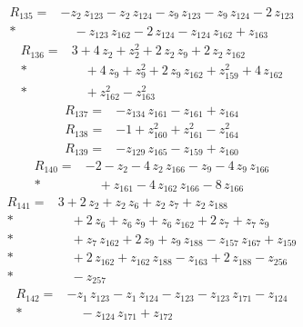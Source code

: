 \documentclass[10pt]{article}
\begin{document}
\begin{align*}
R_{135}={}& - z_{2}\,z_{123} - z_{2}\,z_{124} - z_{9}\,z_{123} - z_{9}\,z_{124} - 2\,z_{123} \\*
&\quad - z_{123}\,z_{162} - 2\,z_{124} - z_{124}\,z_{162} + z_{163}
\end{align*}
\begin{align*}
R_{136}={}& 3 + 4\,z_{2} + z_{2}^{2} + 2\,z_{2}\,z_{9} + 2\,z_{2}\,z_{162} \\*
&\quad + 4\,z_{9} + z_{9}^{2} + 2\,z_{9}\,z_{162} + z_{159}^{2} + 4\,z_{162} \\*
&\quad + z_{162}^{2} - z_{163}^{2}
\end{align*}
\begin{align*}
R_{137}={}& - z_{134}\,z_{161} - z_{161} + z_{164}
\end{align*}
\begin{align*}
R_{138}={}& - 1 + z_{160}^{2} + z_{161}^{2} - z_{164}^{2}
\end{align*}
\begin{align*}
R_{139}={}& - z_{129}\,z_{165} - z_{159} + z_{160}
\end{align*}
\begin{align*}
R_{140}={}& - 2 - z_{2} - 4\,z_{2}\,z_{166} - z_{9} - 4\,z_{9}\,z_{166} \\*
&\quad + z_{161} - 4\,z_{162}\,z_{166} - 8\,z_{166}
\end{align*}
\begin{align*}
R_{141}={}& 3 + 2\,z_{2} + z_{2}\,z_{6} + z_{2}\,z_{7} + z_{2}\,z_{188} \\*
&\quad + 2\,z_{6} + z_{6}\,z_{9} + z_{6}\,z_{162} + 2\,z_{7} + z_{7}\,z_{9} \\*
&\quad + z_{7}\,z_{162} + 2\,z_{9} + z_{9}\,z_{188} - z_{157}\,z_{167} + z_{159} \\*
&\quad + 2\,z_{162} + z_{162}\,z_{188} - z_{163} + 2\,z_{188} - z_{256} \\*
&\quad - z_{257}
\end{align*}
\begin{align*}
R_{142}={}& - z_{1}\,z_{123} - z_{1}\,z_{124} - z_{123} - z_{123}\,z_{171} - z_{124} \\*
&\quad - z_{124}\,z_{171} + z_{172}
\end{align*}
\end{document}
